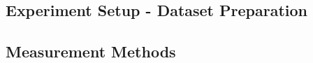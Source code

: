 \documentclass{sig-alternate}
\begin{document}
 







\subsection{Experiment Setup - Dataset Preparation}
\subsection{Measurement Methods}
\end{document}
